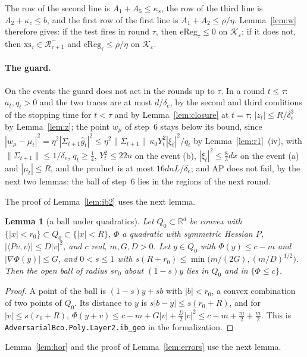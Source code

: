 \documentclass[11pt]{amsart}
\newtheorem{lemma}[theorem]{Lemma}
\theoremstyle{definition}
\numberwithin{equation}{section}
\newcommand{\R}{\mathbb{R}}
\newcommand{\cK}{\mathcal{K}}
\newcommand{\ip}[1]{\langle #1\rangle}
\begin{document}
The row of the second line is $A_1+A_5\le\kappa_s$, the row of the third line is $A_2+\kappa_c\le b$, and the first row of the first line is $A_1+A_2\le\rho/\eta$. Lemma~\ref{lem:w} therefore gives: if the test fires in round $\tau$, then $\mathrm{eReg}_\tau\le0$ on $\cK_\varepsilon$; if it does not, then $\mathrm{xs}_\tau\in\mathcal R^-_{\tau+1}$ and $\mathrm{eReg}_\tau\le\rho/\eta$ on $\cK_\varepsilon$.

\paragraph{The guard.} On the events the guard does not act in the rounds up to $\tau$. In a round $t\le\tau$: $a_t,q_t>0$ and the two traces are at most $d/\delta_e$, by the second and third conditions of the stopping time for $t<\tau$ and by Lemma~\ref{lem:closure} at $t=\tau$; $|z_t|\le R/\delta_e^3$ by Lemma~\ref{lem:z}; the point $w_\mu$ of step~6 stays below its bound, since $|w_\mu-\mu_t|^2=\eta^2|\Sigma_{t+1}\hat g_t|^2\le\eta^2\|\Sigma_{t+1}\|\,\kappa_0Y_t^2|\xi_t|^2/q_t$ by Lemma~\ref{lem:r1}~(iv), with $\|\Sigma_{t+1}\|\le1/\delta_e$, $q_t\ge\frac14$, $Y_t^2\le22n$ on the event (b), $|\xi_t|^2\le\frac83dx$ on the event (a) and $|\mu_t|\le R$, and the product is at most $16dnL/\delta_e$; and AP does not fail, by the next two lemmas: the ball of step~6 lies in the regions of the next round.

The proof of Lemma~\ref{lem:ib2} uses the next lemma.

\begin{lemma}[a ball under quadratics]\label{lem:ibgeo}
Let $Q_0\subset\R^d$ be convex with $\{|x|<r_0\}\subset Q_0\subset\{|x|<R\}$, $\Phi$ a quadratic with symmetric Hessian $P$, $|\ip{Pv,v}|\le D|v|^2$, and $c$ real, $m,G,D>0$. Let $y\in Q_0$ with $\Phi(y)\le c-m$ and $|\nabla\Phi(y)|\le G$, and $0<s\le1$ with $s(R+r_0)\le\min\bigl(m/(2G),(m/D)^{1/2}\bigr)$. Then the open ball of radius $sr_0$ about $(1-s)y$ lies in $Q_0$ and in $\{\Phi\le c\}$.
\end{lemma}

\begin{proof}
A point of the ball is $(1-s)y+sb$ with $|b|<r_0$, a convex combination of two points of $Q_0$. Its distance to $y$ is $s|b-y|\le s(r_0+R)$, and for $|v|\le s(r_0+R)$, $\Phi(y+v)\le c-m+G|v|+\frac D2|v|^2\le c-m+\frac m2+\frac m2$.
This is \texttt{AdversarialBco.Poly.Layer2.ib\_geo} in the formalization.
\end{proof}

Lemma~\ref{lem:hor} and the proof of Lemma~\ref{lem:errors} use the next lemma.
\end{document}
